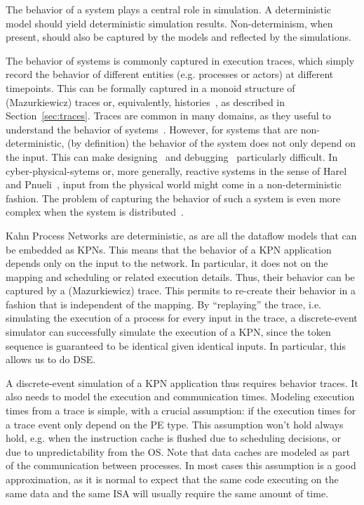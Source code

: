 The behavior of a system plays a central role in simulation. A deterministic model should yield deterministic simulation results.
Non-determinism, when present, should also be captured by the models and reflected by the simulations.

The behavior of systems is commonly captured in execution traces, which simply record the behavior of different entities (e.g. processes or actors) at different timepoints.
This can be formally captured in a monoid structure of (Mazurkiewicz) traces or, equivalently, histories~\cite{diekert1995book}, as described in Section~\ref{sec:traces}.
Traces are common in many domains, as they useful to understand the behavior of systems~\cite{vampir}.
However, for systems that are non-deterministic, (by definition) the behavior of the system does not only depend on the input.
This can make designing~\cite{lee2006problem} and debugging~\cite{murillo_debugging} particularly difficult.
In cyber-physical-sytems or, more generally, reactive systems in the sense of Harel and Pnueli~\cite{harel_pnueli_reactive}, input from the physical world might come in a non-deterministic fashion.
The problem of capturing the behavior of such a system is even more complex when the system is distributed~\cite{shaver_phdthesis}. 

Kahn Process Networks are deterministic, as are all the dataflow models that can be embedded as KPNs.
This means that the behavior of a KPN application depends only on the input to the network.
In particular, it does not on the mapping and scheduling or related execution details.
Thus, their behavior can be captured by a (Mazurkiewicz) trace.
This permits to re-create their behavior in a fashion that is independent of the mapping.
By ``replaying'' the trace, i.e. simulating the execution of a process for every input in the trace, a discrete-event simulator can successfully simulate the execution of a KPN, since the token sequence is guaranteed to be identical given identical inputs.
In particular, this allows us to do \acf{DSE}.

A discrete-event simulation of a KPN application thus requires behavior traces. It also needs to model the execution and communication times.
Modeling execution times from a trace is simple, with a crucial assumption: if the execution times for a trace event only depend on the PE type.
This assumption won't hold always hold, e.g. when the instruction cache is flushed due to scheduling decisions, or due to unpredictability from the \ac{OS}.
Note that data caches are modeled as part of the communication between processes.
In most cases this assumption is a good approximation, as it is normal to expect that the same code executing on the same data and the same \ac{ISA} will usually require the same amount of time.

